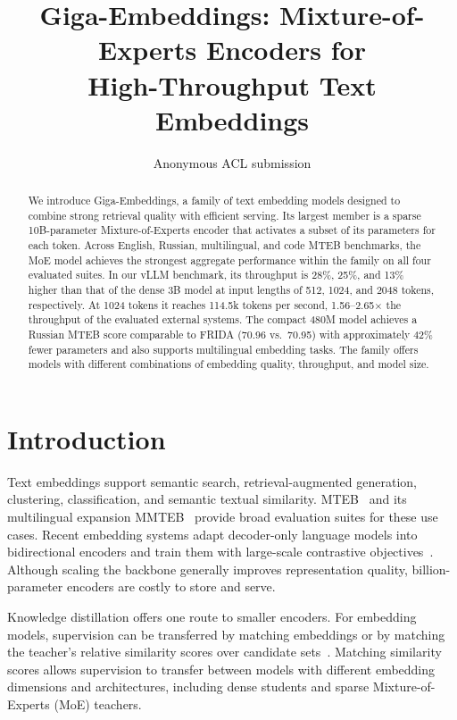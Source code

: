 \documentclass[11pt]{article}
\title{Giga-Embeddings: Mixture-of-Experts Encoders for\\High-Throughput Text Embeddings}
\author{Anonymous ACL submission}
\begin{document}
\maketitle

\begin{abstract}
We introduce Giga-Embeddings, a family of text embedding models designed to combine strong retrieval quality with efficient serving.
Its largest member is a sparse 10B-parameter Mixture-of-Experts encoder that activates a subset of its parameters for each token.
Across English, Russian, multilingual, and code MTEB benchmarks, the MoE model achieves the strongest aggregate performance within the family on all four evaluated suites.
In our vLLM benchmark, its throughput is 28\%, 25\%, and 13\% higher than that of the dense 3B model at input lengths of 512, 1024, and 2048 tokens, respectively.
At 1024 tokens it reaches 114.5k tokens per second, 1.56--2.65$\times$ the throughput of the evaluated external systems.
The compact 480M model achieves a Russian MTEB score comparable to FRIDA (70.96 vs.\ 70.95) with approximately 42\% fewer parameters and also supports multilingual embedding tasks.
The family offers models with different combinations of embedding quality, throughput, and model size.
\end{abstract}

\section{Introduction}
\label{sec:introduction}

Text embeddings support semantic search, retrieval-augmented generation, clustering, classification, and semantic textual similarity.
MTEB~\citep{muennighoff2023mteb} and its multilingual expansion MMTEB~\citep{enevoldsen2025mmteb} provide broad evaluation suites for these use cases.
Recent embedding systems adapt decoder-only language models into bidirectional encoders and train them with large-scale contrastive objectives~\citep{behnamghader2024llm2vec,wang2024improving,lee2025nvembed,kolodin2025gigaembeddings}.
Although scaling the backbone generally improves representation quality, billion-parameter encoders are costly to store and serve.

Knowledge distillation offers one route to smaller encoders.
For embedding models, supervision can be transferred by matching embeddings or by matching the teacher's relative similarity scores over candidate sets~\citep{reimers2020multilingual,xu2023distillcse,zhao2026kalm}.
Matching similarity scores allows supervision to transfer between models with different embedding dimensions and architectures, including dense students and sparse Mixture-of-Experts (MoE) teachers.
\end{document}
